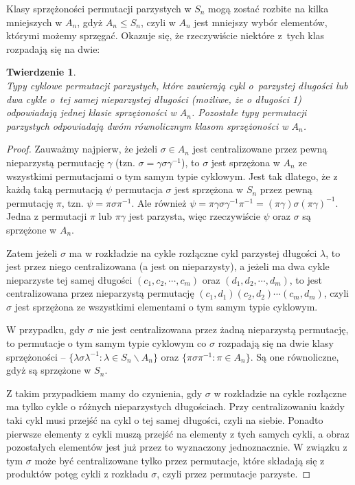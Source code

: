 \documentclass[licencjacka]{pracamgr}
\newtheorem{thh}{Twierdzenie}[section]
\begin{document}
Klasy sprzężoności permutacji parzystych w $S_n$ mogą zostać rozbite na kilka mniejszych w $A_n$, 
gdyż $A_n \le S_n$, czyli w $A_n$ jest mniejszy wybór elementów, którymi możemy sprzęgać.
Okazuje się, że rzeczywiście niektóre z~tych klas rozpadają się na dwie:

\begin{thh}\label{thm_o_klasach_A_n} $ $ \\
	Typy cyklowe permutacji parzystych, które zawierają cykl o~parzystej długości 
	lub dwa cykle o~tej samej nieparzystej długości (możliwe, że o długości 1)
	odpowiadają jednej klasie sprzężoności w $A_n$.
	Pozostałe typy permutacji parzystych odpowiadają dwóm równolicznym klasom sprzężoności w $A_n$.
\end{thh}
\begin{proof}
	Zauważmy najpierw, że jeżeli $\sigma \in A_n$ jest centralizowane przez pewną nieparzystą permutację $\gamma$ 
	(tzn. $\sigma = \gamma \sigma \gamma ^{-1}$), 
	to $\sigma$ jest sprzężona w $A_n$ ze wszystkimi permutacjami o tym samym typie cyklowym.
	Jest tak dlatego, że z każdą taką permutacją $\psi$ permutacja $\sigma$ jest sprzężona w $S_n$ przez pewną permutację $\pi$,
	tzn. $\psi = \pi \sigma \pi^{-1}$.
	Ale również $\psi = \pi \gamma \sigma \gamma^{-1} \pi^{-1} = (\pi \gamma) \sigma (\pi \gamma)^{-1}$.
	Jedna z permutacji $\pi$ lub $\pi \gamma$ jest parzysta, więc rzeczywiście $\psi$ oraz $\sigma$ są sprzężone w $A_n$.

	Zatem jeżeli $\sigma$ ma w rozkładzie na cykle rozłączne cykl parzystej długości $\lambda$, 
	to jest przez niego centralizowana (a jest on nieparzysty),
	a jeżeli ma dwa cykle nieparzyste tej samej długości $(c_1, c_2, \cdots, c_m)$ oraz $(d_1, d_2, \cdots, d_m)$, 
	to jest centralizowana przez nieparzystą permutację $(c_1, d_1)(c_2, d_2) \cdots (c_m, d_m)$,
	czyli $\sigma$ jest sprzężona ze wszystkimi elementami o tym samym typie cyklowym.

	W przypadku, gdy $\sigma$ nie jest centralizowana przez żadną nieparzystą permutację,
	to permutacje o tym samym typie cyklowym co $\sigma$ rozpadają się na dwie klasy sprzężoności --
	$\{\lambda \sigma \lambda^{-1} \colon \lambda \in S_n \backslash A_n \}$ oraz
	$\{\pi \sigma \pi^{-1} \colon \pi \in  A_n \}$.
	Są one równoliczne, gdyż są sprzężone w $S_n$.

	Z takim przypadkiem mamy do czynienia, gdy $\sigma$ w rozkładzie na cykle rozłączne 
	ma tylko cykle o różnych nieparzystych długościach.
	Przy centralizowaniu każdy taki cykl musi przejść na cykl o tej samej długości, czyli na siebie.
	Ponadto pierwsze elementy z cykli muszą przejść na elementy z tych samych cykli, 
	a obraz pozostałych elementów jest już przez to wyznaczony jednoznacznie.
	W związku z tym $\sigma$ może być centralizowane tylko przez permutacje, 
	które składają się z produktów potęg cykli z rozkładu $\sigma$, 
	czyli przez permutacje parzyste.
\end{proof}
\end{document}
